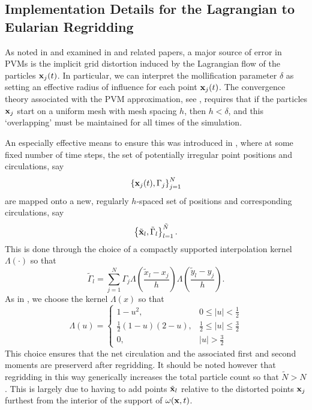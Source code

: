 \documentclass[a4paper,11pt]{article}
\begin{document}
\subsection*{Implementation Details for the Lagrangian to Eularian Regridding}
As noted in \cite{beale} and examined in \cite{cottet} and related papers, a major source of error in PVMs is the implicit grid distortion induced by the Lagrangian flow of the particles ${\bf x}_{j}(t)$.  In particular, we can interpret the mollification parameter $\delta$ as setting an effective radius of influence for each point ${\bf x}_{j}(t)$.  The convergence theory associated with the PVM approximation, see \cite{cottet2}, requires that if the particles ${\bf x}_{j}$ start on a uniform mesh with mesh spacing $h$, then $h < \delta$, and this `overlapping' must be maintained for all times of the simulation.  

An especially effective means to ensure this was introduced in \cite{koumoutsakos}, where at some fixed number of time steps, the set of potentially irregular point positions and circulations, say 
\[ 
\left\{{\bf x}_{j}(t), \Gamma_{j} \right\}_{j=1}^{N}
\]
are mapped onto a new, regularly $h$-spaced set of positions and corresponding circulations, say  
\[
\left\{\tilde{{\bf x}}_{l}, \tilde{\Gamma}_{l} \right\}_{l=1}^{\tilde{N}}.
\]
This is done through the choice of a compactly supported interpolation kernel $\Lambda(\cdot)$ so that 
\[
\tilde{\Gamma}_{l} = \sum_{j=1}^{N} \Gamma_{j}\Lambda\left(\frac{\tilde{x}_{l}-x_{j}}{h} \right)\Lambda\left(\frac{\tilde{y}_{l}-y_{j}}{h} \right).
\]
As in \cite{koumoutsakos}, we choose the kernel $\Lambda(x)$ so that 
\[
\Lambda(u) = \left\{
\begin{array}{rl} 
1 - u^{2}, & 0\leq |u| < \frac{1}{2}\\
\frac{1}{2}(1-u)(2-u), & \frac{1}{2}\leq |u|\leq \frac{3}{2}\\
0, & |u| > \frac{3}{2}
\end{array}
\right.
\]
This choice ensures that the net circulation and the associated first and second moments are preserverd after regridding.  It should be noted however that regridding in this way generically increases the total particle count so that $\tilde{N}>N$.  This is largely due to having to add points $\tilde{{\bf x}}_{l}$ relative to the distorted points ${\bf x}_{j}$ furthest from the interior of the support of $\omega({\bf x},t)$.   
\end{document}
